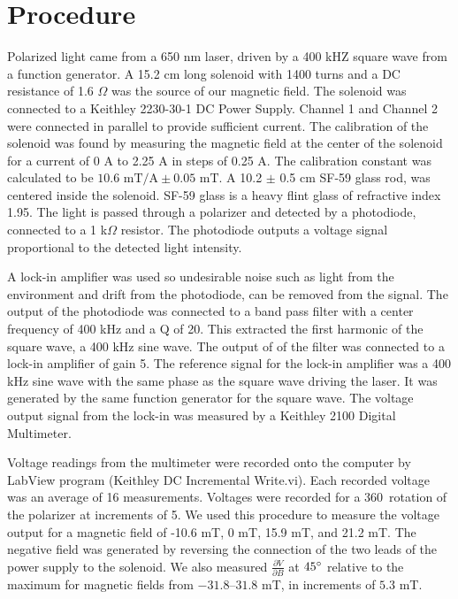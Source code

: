 \documentclass[prb,preprint]{revtex4-1}
\begin{document}
\section{Procedure}
{Polarized light came from a 650 nm laser, driven by a 400 kHZ square wave from a function generator. A 15.2 cm long solenoid with 1400 turns and a DC resistance of 1.6 $\Omega$ was the source of our magnetic field. The solenoid was connected to a Keithley 2230-30-1 DC Power Supply. Channel 1 and Channel 2 were connected in parallel to provide sufficient current. The calibration of the solenoid was found by measuring the magnetic field at the center of the solenoid for a current of 0 A to 2.25 A in steps of 0.25 A. The calibration constant was calculated to be $10.6 \textrm{~mT/A} \pm 0.05 \text{~mT}$. A 10.2 $\pm$ 0.5 cm SF-59 glass rod, was centered inside the solenoid. SF-59 glass is a heavy flint glass of refractive index 1.95.  The light is passed through a polarizer and detected by a photodiode, connected to a 1 k$\Omega$ resistor. The photodiode outputs a voltage signal proportional to the detected light intensity.

A lock-in amplifier was used so undesirable noise such as light from the environment and drift from the photodiode, can be removed from the signal. The output of the photodiode was connected to a band pass filter with a center frequency of 400 kHz and a Q of 20. This extracted the first harmonic of the square wave, a 400 kHz sine wave. The output of of the filter was connected to a lock-in amplifier of gain 5. The reference signal for the lock-in amplifier was a 400 kHz sine wave with the same phase as the square wave driving the laser. It was generated by the same function generator for the square wave. The voltage output signal from the lock-in was measured by a Keithley 2100 Digital Multimeter.

Voltage readings from the multimeter were recorded onto the computer by LabView program (Keithley DC Incremental Write.vi). Each recorded voltage was an average of 16 measurements. Voltages were recorded for a 360\degree\ rotation of the polarizer at increments of 5\degree. We used this procedure to measure the voltage output for a magnetic field of -10.6 mT, 0 mT, 15.9 mT, and 21.2 mT. The negative field was generated by reversing the connection of the two leads of the power supply to the solenoid. We also measured  $\frac{\partial V}{\partial B}$ at $45\degree$ relative to the maximum for magnetic fields from $-31.8$--$31.8$ mT, in increments of $5.3$ mT.
}
\end{document}
